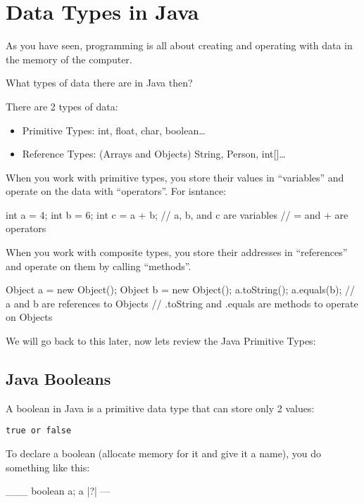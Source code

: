 \documentclass[8pt, a4paper, oneside]{extarticle}
\begin{document}
\section{Data Types in Java}

As you have seen, programming is all about creating and operating with data in
the memory of the computer.

What types of data there are in Java then?

There are 2 types of data:

\begin{itemize}

  \item Primitive Types: int, float, char, boolean\ldots

  \item Reference Types: (Arrays and Objects) String, Person, int[]\ldots

\end{itemize}

When you work with primitive types, you store their values in ``variables'' and
operate on the data with ``operators''. For isntance:

\begin{blackboard}
int a = 4;
int b = 6;
int c = a + b;
// a, b, and c are variables
// = and + are operators
\end{blackboard}

When you work with composite types, you store their addresses in ``references''
and operate on them by calling ``methods''.

\begin{blackboard}
Object a = new Object();
Object b = new Object();
a.toString();
a.equals(b);
// a and b are references to Objects
// .toString and .equals are methods to operate on Objects
\end{blackboard}

We will go back to this later, now lets review the Java Primitive Types:

\subsection{Java Booleans}

A boolean in Java is a primitive data type that can store only 2 values:

\verb+true or false+

To declare a boolean (allocate memory for it and give it a name), you do
something like this:

\begin{blackboard}
                 ___
boolean a;     a |?|
                 ---
\end{blackboard}
\end{document}
